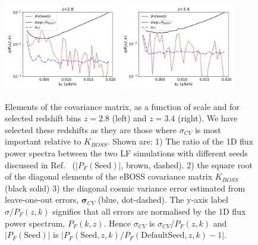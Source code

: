 \begin{figure}
    \centering
    \includegraphics[width=0.45\textwidth]{figures/err-2.8.pdf}
    \includegraphics[width=0.45\textwidth]{figures/err-3.4.pdf}
    \caption{\label{fig:covariance_loo}
     Elements of the covariance matrix, as a function of scale and for selected redshift bins $z=2.8$ (left) and $z=3.4$ (right). We have selected these redshifts as they are those where $\sigma_{CV}$ is most important relative to $K_{BOSS}$. 
    Shown are:  1) The ratio of the 1D flux power spectra between the two LF simulations with different seeds discussed in Ref.~\protect\cite{2023simsuite} ($|P_F(\mathrm{Seed})|$, brown, dashed).
    2) the square root of the diagonal elements of the eBOSS covariance matrix $K_{BOSS}$ (black solid) 3) the diagonal cosmic variance error estimated from leave-one-out errors, $\boldsymbol{\sigma}_{CV}$ (blue, dot-dashed). The y-axis label $\sigma/P_F(z,k)$ signifies that all errors are normalised by the 1D flux power spectrum, $P_F(k, z)$. Hence $\sigma_{CV}$ is $\sigma_{CV}/ P_F(z,k)$ and $|P_F(\mathrm{Seed})|$ is $|P_F(\mathrm{Seed}, z,k)/P_F(\mathrm{Default Seed}, z, k)-1|$.}
\end{figure}


